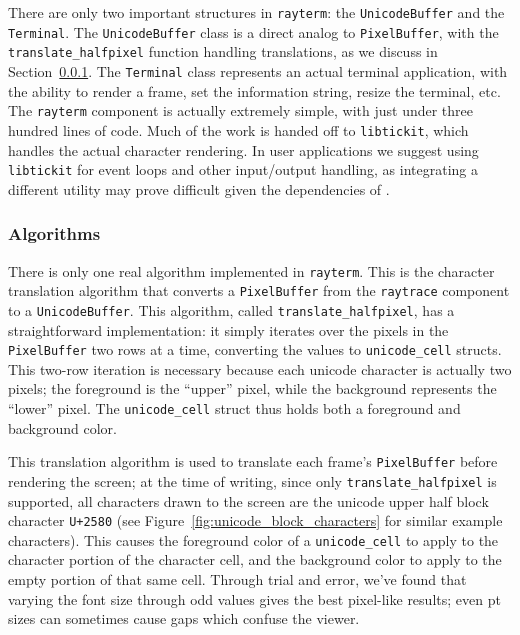 There are only two important structures in \texttt{rayterm}: the \texttt{UnicodeBuffer} and the \texttt{Terminal}.
The \texttt{UnicodeBuffer} class is a direct analog to \texttt{PixelBuffer},
with the \texttt{translate\_halfpixel} function handling translations, as we discuss in Section~\ref{ch:methods:interface:tickit:algorithms}.
The \texttt{Terminal} class represents an actual terminal application, with the ability to render a frame, set the information string, resize the terminal, etc.
The \texttt{rayterm} component is actually extremely simple, with just under three hundred lines of code.
Much of the work is handed off to \texttt{libtickit}, which handles the actual character rendering.
In user applications we suggest using \texttt{libtickit} for event loops and other input/output handling, as integrating a different utility may prove difficult given the dependencies of \name{}.

\subsubsection{Algorithms} \label{ch:methods:interface:tickit:algorithms}

There is only one real algorithm implemented in \texttt{rayterm}.
This is the character translation algorithm that converts a \texttt{PixelBuffer} from the \texttt{raytrace} component to a \texttt{UnicodeBuffer}.
This algorithm, called \texttt{translate\_halfpixel}, has a straightforward implementation: it simply iterates over the pixels in the \texttt{PixelBuffer} two rows at a time, converting the values to \texttt{unicode\_cell} structs.
This two-row iteration is necessary because each unicode character is actually two pixels; the foreground is the ``upper'' pixel, while the background represents the ``lower'' pixel.
The \texttt{unicode\_cell} struct thus holds both a foreground and background color.

This translation algorithm is used to translate each frame's \texttt{PixelBuffer} before rendering the screen; at the time of writing, since only \texttt{translate\_halfpixel} is supported, all characters drawn to the screen are the unicode upper half block character \texttt{U+2580} (see Figure~\ref{fig:unicode_block_characters} for similar example characters).
This causes the foreground color of a \texttt{unicode\_cell} to apply to the character portion of the character cell, and the background color to apply to the empty portion of that same cell.
Through trial and error, we've found that varying the font size through odd values gives the best pixel-like results; even pt sizes can sometimes cause gaps which confuse the viewer.

